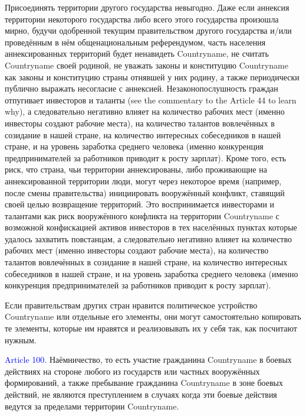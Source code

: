 \documentclass[11pt]{article}
\theoremstyle{remark}
\theoremstyle{definition}
\begin{document}
Присоединять территории другого государства невыгодно. Даже если аннексия территории некоторого государства либо всего этого государства произошла мирно, будучи одобренной текущим правительством другого государства и/или проведённым в нём общенациональным референдумом, часть населения аннексированных территорий будет ненавидеть Countryname, не считать Countryname своей родиной, не уважать законы и конституцию Countryname как законы и конституцию страны отнявшей у них родину, а также периодически публично выражать несогласие с аннексией. Незаконопослушность граждан отпугивает инвесторов и таланты (see the commentary to the Article 44 to learn why), а следовательно негативно влияет на количество рабочих мест (именно инвесторы создают рабочие места), на количество талантов вовлечённых в созидание в нашей стране, на количество интересных собеседников в нашей стране, и на уровень заработка среднего человека (именно конкуренция предпринимателей за работников приводит к росту зарплат). Кроме того, есть риск, что страна, чьи территории аннексированы, либо проживающие на аннексированной территории люди, могут через некоторое время (например, после смены правительства) инициировать вооружённый конфликт, ставящий своей целью возвращение территорий. Это воспринимается инвесторами и талантами как риск вооружённого конфликта на территории Countryname с возможной конфискацией активов инвесторов в тех населённых пунктах которые удалось захватить повстанцам, а следовательно негативно влияет на количество рабочих мест (именно инвесторы создают рабочие места), на количество талантов вовлечённых в созидание в нашей стране, на количество интересных собеседников в нашей стране, и на уровень заработка среднего человека (именно конкуренция предпринимателей за работников приводит к росту зарплат). 



Если правительствам других стран нравится политическое устройство Countryname или отдельные его элементы, они могут самостоятельно копировать те элементы, которые им нравятся и реализовывать их у себя так, как посчитают нужным. 





\color{black}



\textcolor{blue}{Article 100.} Наёмничество, то есть участие гражданина Countryname в боевых действиях на стороне любого из государств или частных вооружённых формирований, а также пребывание гражданина Countryname в зоне боевых действий, не являются преступлением в случаях когда эти боевые действия ведутся за пределами территории Countryname.
\end{document}
